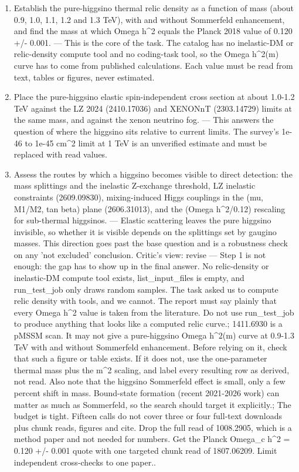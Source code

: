 \documentclass[11pt,a4paper]{article}
\begin{document}
\begin{enumerate}
  \item Establish the pure-higgsino thermal relic density as a function of mass (about 0.9, 1.0, 1.1, 1.2 and 1.3 TeV), with and without Sommerfeld enhancement, and find the mass at which Omega h\textasciicircum{}2 equals the Planck 2018 value of 0.120 +/- 0.001. --- This is the core of the task. The catalog has no inelastic-DM or relic-density compute tool and no coding-task tool, so the Omega h\textasciicircum{}2(m) curve has to come from published calculations. Each value must be read from text, tables or figures, never estimated.
  \item Place the pure-higgsino elastic spin-independent cross section at about 1.0-1.2 TeV against the LZ 2024 (2410.17036) and XENONnT (2303.14729) limits at the same mass, and against the xenon neutrino fog. --- This answers the question of where the higgsino sits relative to current limits. The survey's 1e-46 to 1e-45 cm\textasciicircum{}2 limit at 1 TeV is an unverified estimate and must be replaced with read values.
  \item Assess the routes by which a higgsino becomes visible to direct detection: the mass splittings and the inelastic Z-exchange threshold, LZ inelastic constraints (2609.09830), mixing-induced Higgs couplings in the (mu, M1/M2, tan beta) plane (2606.31013), and the (Omega h\textasciicircum{}2/0.12) rescaling for sub-thermal higgsinos. --- Elastic scattering leaves the pure higgsino invisible, so whether it is visible depends on the splittings set by gaugino masses. This direction goes past the base question and is a robustness check on any 'not excluded' conclusion.
Critic's view: revise --- Step 1 is not enough: the gap has to show up in the final answer. No relic-density or inelastic-DM compute tool exists, list\_input\_files is empty, and run\_test\_job only draws random samples. The task asked us to compute relic density with tools, and we cannot. The report must say plainly that every Omega h\textasciicircum{}2 value is taken from the literature. Do not use run\_test\_job to produce anything that looks like a computed relic curve.; 1411.6930 is a pMSSM scan. It may not give a pure-higgsino Omega h\textasciicircum{}2(m) curve at 0.9-1.3 TeV with and without Sommerfeld enhancement. Before relying on it, check that such a figure or table exists. If it does not, use the one-parameter thermal mass plus the m\textasciicircum{}2 scaling, and label every resulting row as derived, not read. Also note that the higgsino Sommerfeld effect is small, only a few percent shift in mass. Bound-state formation (recent 2021-2026 work) can matter as much as Sommerfeld, so the search should target it explicitly.; The budget is tight. Fifteen calls do not cover three or four full-text downloads plus chunk reads, figures and cite. Drop the full read of 1008.2905, which is a method paper and not needed for numbers. Get the Planck Omega\_c h\textasciicircum{}2 = 0.120 +/- 0.001 quote with one targeted chunk read of 1807.06209. Limit independent cross-checks to one paper..

\end{enumerate}
\end{document}
